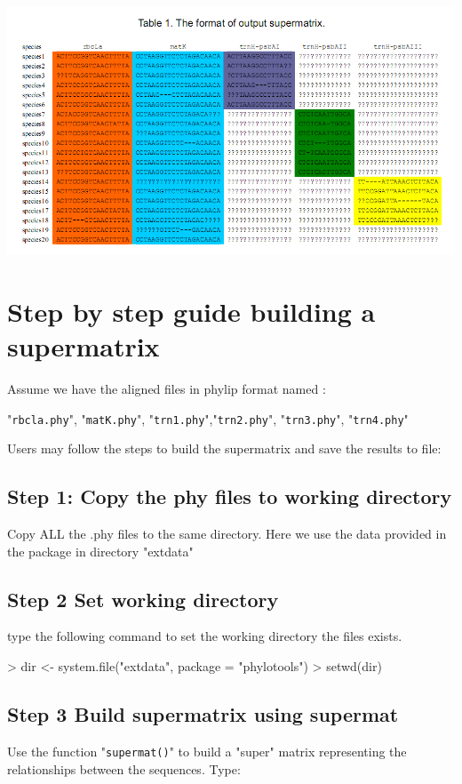 \documentclass[12pt]{article}
\begin{document}
\includegraphics[width = 15cm]{table1.PNG}

\section{Step by step guide building a supermatrix}
Assume we have the aligned files in phylip format named :

"\texttt{rbcla.phy}", 
"\texttt{matK.phy}", 
"\texttt{trn1.phy}","\texttt{trn2.phy}", "\texttt{trn3.phy}", "\texttt{trn4.phy}"

Users may follow the steps to build the supermatrix and save the results to file:

\subsection{Step 1: Copy the phy files to working directory}
 Copy ALL the .phy files to the same directory. Here we use the data provided in the package in directory "extdata" 
 
\subsection{Step 2 Set working directory}
type the following command to set the working directory the files exists.

\begin{Schunk}
\begin{Sinput}
> dir <- system.file("extdata", package = "phylotools")
> setwd(dir)
\end{Sinput}
\end{Schunk}

\subsection{Step 3 Build supermatrix using supermat}
Use the function "\texttt{supermat()}" to build a "super" matrix representing the relationships between the sequences. Type:
\end{document}
